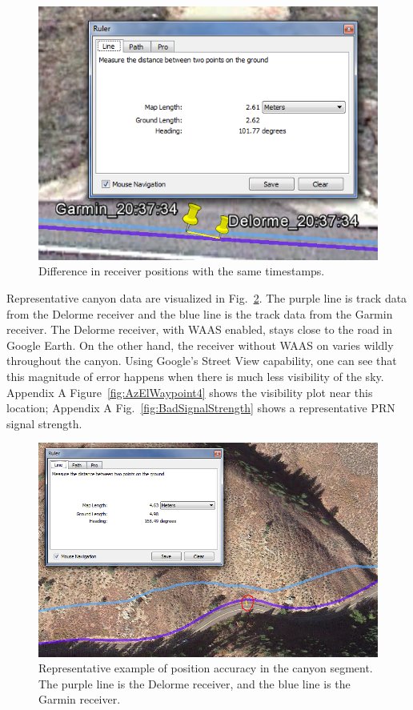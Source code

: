 \documentclass[]{aiaa-tc}%
\begin{document}
	\begin{figure}[H]
		\centering
		\includegraphics[width = 13cm]{ClockError.PNG}
		\caption{Difference in receiver positions with the same timestamps.}
		\label{fig:ClockError}
	\end{figure}
	
	\noindent Representative canyon data are visualized in Fig.~\ref{fig:badPreWP4}. The purple line is track data from the Delorme receiver and the blue line is the track data from the Garmin receiver. The Delorme receiver, with WAAS enabled, stays close to the road in Google Earth. On the other hand, the receiver without WAAS on varies wildly throughout the canyon. Using Google's Street View capability, one can see that this magnitude of error happens when there is much less visibility of the sky. Appendix A Figure~\ref{fig:AzElWaypoint4} shows the visibility plot near this location; Appendix A Fig.~\ref{fig:BadSignalStrength} shows a representative PRN signal strength.

	\begin{figure}[H]
		\centering
		\includegraphics[width = 13cm]{badPreWP4.PNG}
		\caption{Representative example of position accuracy in the canyon segment. The purple line is the Delorme receiver, and the blue line is the Garmin receiver. }
		\label{fig:badPreWP4}
	\end{figure}
\end{document}
